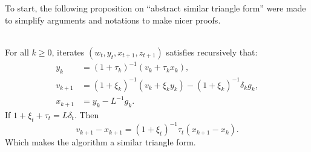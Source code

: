 \documentclass[12pt]{article}
\begin{document}
    To start, the following proposition on ``abstract similar triangle form'' were made to simplify arguments and notations to make nicer proofs. 


    \begin{proposition}\label{prop:abs-st-form}\;\\
        For all $k\ge 0$, iterates $(w_t, y_t, x_{t + 1}, z_{t + 1})$ satisfies recursively that: 
        \begin{align*}
            y_k &= (1 + \tau_k)^{-1}(v_k + \tau_k x_k),
            \\
            v_{k + 1} &= (1 + \xi_k)^{-1}(v_k + \xi_k y_k) - (1 + \xi_k)^{-1}\delta_k g_k,
            \\
            x_{k + 1} &= y_k - L^{-1} g_k. 
        \end{align*}
        If $1 + \xi_t + \tau_t = L\delta_t$. Then 
        $$
            v_{k + 1} - x_{k + 1} = (1 + \xi_t)^{-1}\tau_t(x_{k + 1} - x_k). 
        $$
        Which makes the algorithm a similar triangle form. 
    \end{proposition}
\end{document}
